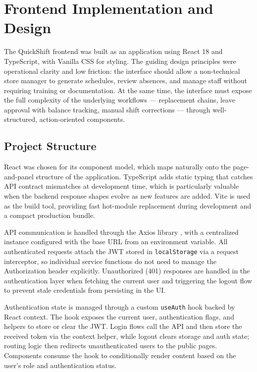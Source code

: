 \chapter{Frontend Implementation and Design}
\label{chap:ch6}

\par The QuickShift frontend was built as an application using React 18 and TypeScript, with Vanilla CSS for styling. The guiding design principles were operational clarity and low friction: the interface should allow a non-technical store manager to generate schedules,  review absences, and manage staff without requiring training or documentation. At the same time, the interface must expose the full complexity of the underlying workflows — replacement chains, leave approval with balance tracking, manual shift corrections — through well-structured, action-oriented components.

\section{Project Structure}
\par React was chosen for its component model, which maps naturally onto the page-and-panel structure of the application. TypeScript adds static typing that catches API contract mismatches at development time, which is particularly valuable when the backend response shapes evolve as new features are added. Vite is used as the build tool, providing fast hot-module replacement during development and a compact production bundle.

\par API communication is handled through the Axios library \cite{axios}, with a centralized instance configured with the base URL from an environment variable. All authenticated requests attach the JWT stored in \texttt{localStorage} via a request interceptor, so individual service functions do not need to manage the Authorization header explicitly.  Unauthorized (401) responses are handled in the authentication layer when fetching the current user and triggering the logout flow to prevent stale credentials from persisting in the UI.

\par Authentication state is managed through a custom \texttt{useAuth} hook backed by React context. The hook exposes the current user, authentication flags, and helpers to store or clear the JWT. Login flows call the API and then store the received token via the context helper, while logout clears storage and auth state; routing logic then redirects unauthenticated users to the public pages. Components consume the hook to conditionally render content based on the user’s role and authentication status.

